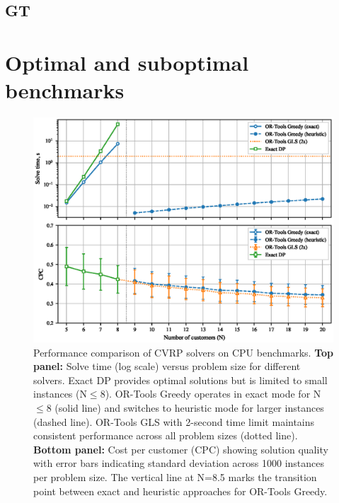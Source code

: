 \documentclass[a4paper,twoside]{article}
\begin{document}
\subsection{GT}


\section{Optimal and suboptimal benchmarks}

\begin{figure}[t!]
\centering
   \includegraphics[width=160mm]{figures/benchmark.eps}
   \caption{Performance comparison of CVRP solvers on CPU benchmarks. 
       \textbf{Top panel:} Solve time (log scale) versus problem size for different solvers. 
       Exact DP provides optimal solutions but is limited to small instances (N$\leq$8). 
       OR-Tools Greedy operates in exact mode for N$\leq$8 (solid line) and switches to heuristic mode for larger instances (dashed line). 
       OR-Tools GLS with 2-second time limit maintains consistent performance across all problem sizes (dotted line). 
       \textbf{Bottom panel:} Cost per customer (CPC) showing solution quality with error bars indicating standard deviation across 1000 instances per problem size. 
       The vertical line at N=8.5 marks the transition point between exact and heuristic approaches for OR-Tools Greedy.}
\label{fig:benchmark}
\end{figure}
\end{document}
